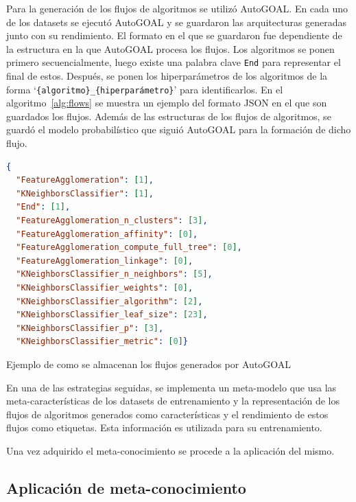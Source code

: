 Para la generación de los flujos de algoritmos se utilizó AutoGOAL. En cada uno de los datasets se ejecutó AutoGOAL y se guardaron las arquitecturas generadas junto con su rendimiento. El formato en el que se guardaron fue dependiente de la estructura en la que AutoGOAL procesa los flujos. Los algoritmos se ponen primero secuencialmente, luego existe una palabra clave \texttt{End} para representar el final de estos. Después, se ponen los hiperparámetros de los algoritmos de la forma  `\texttt{\{algoritmo\}\_\{hiperparámetro\}}' para identificarlos. En el algoritmo~\ref{alg:flows} se muestra un ejemplo del formato JSON en el que son guardados los flujos. Además de las estructuras de los flujos de algoritmos, se guardó el modelo probabilístico que siguió AutoGOAL para la formación de dicho flujo.

\begin{algorithm}
\begin{lstlisting}[language=json,firstnumber=1]
{
  "FeatureAgglomeration": [1],
  "KNeighborsClassifier": [1],
  "End": [1],
  "FeatureAgglomeration_n_clusters": [3],
  "FeatureAgglomeration_affinity": [0],
  "FeatureAgglomeration_compute_full_tree": [0],
  "FeatureAgglomeration_linkage": [0],
  "KNeighborsClassifier_n_neighbors": [5],
  "KNeighborsClassifier_weights": [0],
  "KNeighborsClassifier_algorithm": [2],
  "KNeighborsClassifier_leaf_size": [23],
  "KNeighborsClassifier_p": [3],
  "KNeighborsClassifier_metric": [0]}
\end{lstlisting}
\caption{Ejemplo de como se almacenan los flujos generados por AutoGOAL}
\label{alg:flows}
\end{algorithm}

En una de las estrategias seguidas, se implementa un meta-modelo que usa las meta-características de los datasets de entrenamiento y la representación de los flujos de algoritmos generados como características y el rendimiento de estos flujos como etiquetas. Esta información es utilizada para su entrenamiento.

Una vez adquirido el meta-conocimiento se procede a la aplicación del mismo.

\subsection{Aplicación de meta-conocimiento}\label{sub:aplicacion}


